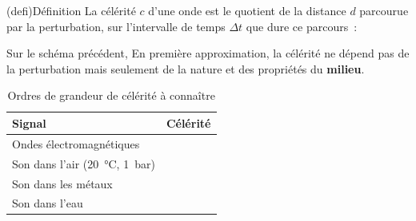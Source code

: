 \documentclass[../../main/main.tex]{subfiles}
\begin{document}
\begin{tcb}(defi){Définition}
	La célérité $c$ d'une onde est le quotient de la distance $d$ parcourue par la
	perturbation, sur l'intervalle de temps $\Delta t$ que dure ce parcours~:
	\psw{
		\[\boxed{c = \frac{d}{\Delta t}}\]
	}
	\vspace{-15pt}
\end{tcb}

Sur le schéma précédent,
\psw{
	\[
		\boxed{c = \frac{x_2-x_1}{t_2-t_1}}
	\]
}
En première approximation, la célérité ne dépend pas de la perturbation mais
seulement de la nature et des propriétés du \textbf{milieu}.
\begin{table}[h]
	\centering
	\caption{Ordres de grandeur de célérité à connaître}
	\label{tab:ctoknow}
	\begin{tabularx}{.6\linewidth}{lY}
		\toprule
		Signal                   & Célérité
		\\\midrule
		Ondes électromagnétiques & 
		\\
		Son dans l'air (\SI{20}{\degreeCelsius},
		\SI{1}{bar})             & 
		\\
		Son dans les métaux      & 
		\\
		Son dans l'eau           & 
		\\\bottomrule
	\end{tabularx}
\end{table}
\end{document}
